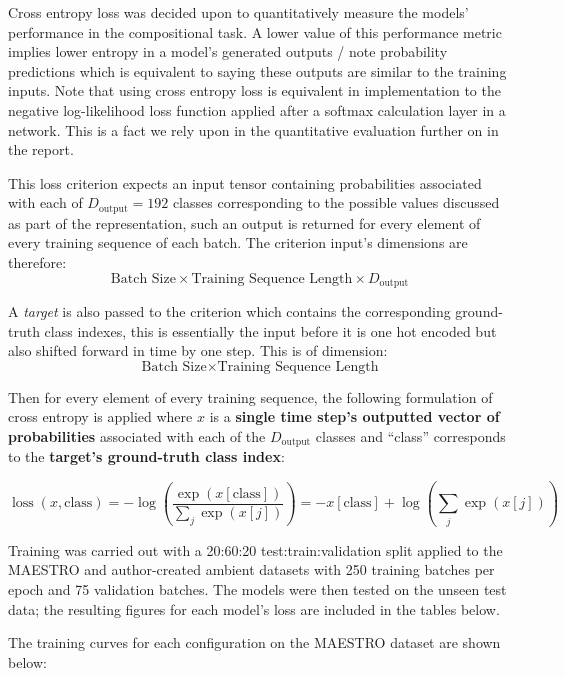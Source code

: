 \documentclass[12pt,]{article}
\begin{document}
Cross entropy loss was decided upon to quantitatively measure the
models' performance in the compositional task. A lower value of this
performance metric implies lower entropy in a model's generated outputs
/ note probability predictions which is equivalent to saying these
outputs are similar to the training inputs. Note that using cross
entropy loss is equivalent in implementation to the negative
log-likelihood loss function applied after a softmax calculation layer
in a network. This is a fact we rely upon in the quantitative evaluation
further on in the report.

This loss criterion expects an input tensor containing probabilities
associated with each of \(D_{\text{output}} = 192\) classes
corresponding to the possible values discussed as part of the
representation, such an output is returned for every element of every
training sequence of each batch. The criterion input's dimensions are
therefore:
\[\text{Batch Size} \times \text{Training Sequence Length} \times D_{\text{output}}\]

A \emph{target} is also passed to the criterion which contains the
corresponding ground-truth class indexes, this is essentially the input
before it is one hot encoded but also shifted forward in time by one
step. This is of dimension:
\[\text{Batch Size} \times \text{Training Sequence Length}\]

Then for every element of every training sequence, the following
formulation of cross entropy is applied where \(x\) is a \textbf{single
time step's outputted vector of probabilities} associated with each of
the \(D_{\text{output}}\) classes and ``class'' corresponds to the
\textbf{target's ground-truth class index}:

\[
\operatorname{loss}(x, \text {class})=-\log \left(\frac{\exp (x[\text{class}])}{\sum_{j} \exp (x[j])}\right)=-x[\text {class}]+\log \left(\sum_{j} \exp (x[j])\right)
\]

Training was carried out with a 20:60:20 test:train:validation split
applied to the MAESTRO and author-created ambient datasets with 250
training batches per epoch and 75 validation batches. The models were
then tested on the unseen test data; the resulting figures for each
model's loss are included in the tables below.

The training curves for each configuration on the MAESTRO dataset are
shown below:
\end{document}

